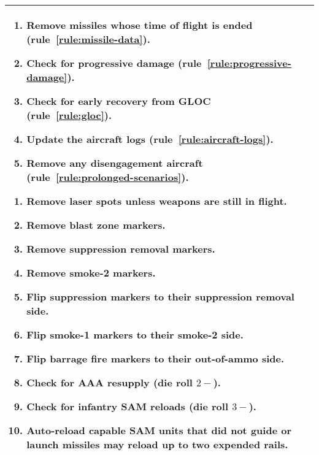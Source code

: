 \begin{twocolumntable}
\begin{tabularx}{1.0\linewidth}{L@{\hspace{\columnsep}}L}
{\begin{enumerate}[start=7]

\begin{enumerate}[nosep]
    \item Remove missiles whose time of flight is ended (rule~\ref{rule:missile-data}).
    \item Check for progressive damage (rule~\ref{rule:progressive-damage}).
    \item Check for early recovery from GLOC (rule~\ref{rule:gloc}).
    \item Update the aircraft logs (rule~\ref{rule:aircraft-logs}).
    \item Remove any disengagement aircraft (rule~\ref{rule:prolonged-scenarios}).
\end{enumerate}


\begin{enumerate}[nosep]
    \item Remove laser spots unless weapons are still in flight.
    \item Remove blast zone markers.
    \item Remove suppression removal markers.
    \item Remove smoke-2 markers.
    \item Flip suppression markers to their suppression removal side.
    \item Flip smoke-1 markers to their smoke-2 side.
    \item Flip barrage fire markers to their out-of-ammo side.
    \item Check for AAA resupply (die roll $2-$).
    \item Check for infantry SAM reloads (die roll $3-$).
    \item Auto-reload capable SAM units that did not guide or launch missiles may reload up to two expended rails.
\end{enumerate}

\end{enumerate}

}

\\
\bottomrule
\end{tabularx}

\end{twocolumntable}

